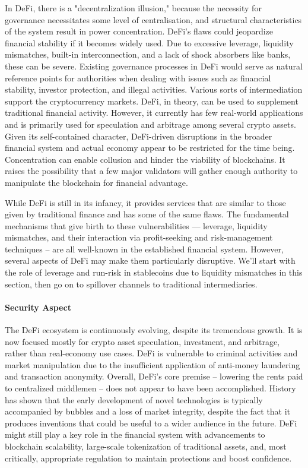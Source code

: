 \documentclass[10pt,twocolumn]{article}
\begin{document}
In DeFi, there is a "decentralization illusion," because the necessity for governance necessitates some level of centralisation, and structural characteristics of the system result in power concentration. DeFi's flaws could jeopardize financial stability if it becomes widely used. Due to excessive leverage, liquidity mismatches, built-in interconnection, and a lack of shock absorbers like banks, these can be severe. Existing governance processes in DeFi would serve as natural reference points for authorities when dealing with issues such as financial stability, investor protection, and illegal activities. Various sorts of intermediation support the cryptocurrency markets. DeFi, in theory, can be used to supplement traditional financial activity.
However, it currently has few real-world applications and is primarily used for speculation and arbitrage among several crypto assets. Given its self-contained character, DeFi-driven disruptions in the broader financial system and actual economy appear to be restricted for the time being. Concentration can enable collusion and hinder the viability of blockchains. It raises the possibility that a few major validators will gather enough authority to manipulate the blockchain for financial advantage. 

While DeFi is still in its infancy, it provides services that are similar to those given by traditional finance and has some of the same flaws. The fundamental mechanisms that give birth to these vulnerabilities — leverage, liquidity mismatches, and their interaction via profit-seeking and risk-management techniques – are all well-known in the established financial system. However, several aspects of DeFi may make them particularly disruptive. We'll start with the role of leverage and run-risk in stablecoins due to liquidity mismatches in this section, then go on to spillover channels to traditional intermediaries.
\paragraph{Security Aspect}

The DeFi ecosystem is continuously evolving, despite its tremendous growth. It is now focused mostly for crypto asset speculation, investment, and arbitrage, rather than real-economy use cases. DeFi is vulnerable to criminal activities and market manipulation due to the insufficient application of anti-money laundering and transaction anonymity. Overall, DeFi's core premise – lowering the rents paid to centralized middlemen – does not appear to have been accomplished.\cite{Fletcher}
History has shown that the early development of novel technologies is typically accompanied by bubbles and a loss of market integrity, despite the fact that it produces inventions that could be useful to a wider audience in the future. DeFi might still play a key role in the financial system with advancements to blockchain scalability, large-scale tokenization of traditional assets, and, most critically, appropriate regulation to maintain protections and boost confidence.
\end{document}
